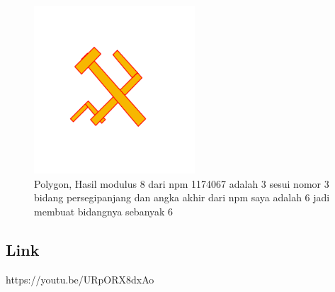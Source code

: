 \begin{enumerate}
	
	\begin{figure}[H]
		\includegraphics[width=6cm]{figures/Tugas2/1174067/10.png}
		\centering
		\caption{Polygon, Hasil modulus 8 dari npm 1174067 adalah 3 sesui nomor 3 bidang persegipanjang dan angka akhir dari npm saya adalah 6 jadi membuat bidangnya sebanyak 6}
	\end{figure}
\end{enumerate}
\subsection{Link}
	https://youtu.be/URpORX8dxAo